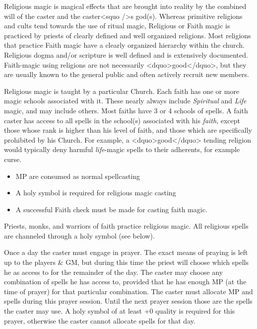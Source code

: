 Religious magic is magical effects that are brought into reality by
the combined will of the caster and the caster<squo />s god(s).  Whereas
primitive religions and cults tend towards the use of ritual magic,
Religious or Faith magic is practiced by priests of clearly defined
and well organized religions.  Most religions that practice Faith
magic have a clearly organized hierarchy within the church.  Religious
dogma and/or scripture is well defined and is extensively documented.
Faith-magic using religions are not necessarily <dquo>good</dquo>, but they are
usually known to the general public and often actively recruit new
members.

Religious magic is taught by a particular Church. Each faith has one
or more magic schools associated with it.  These nearly always include
\emph{Spiritual} and \emph{Life} magic, and may include others.  Most
faiths have 3 or 4 schools of spells.  A faith caster has access to
all spells in the school(s) associated with his \emph{faith}, except
those whose rank is higher than his level of faith, and those which
are specifically prohibited by his Church.  For example, a <dquo>good</dquo>
tending religion would typically deny harmful \emph{life}-magic spells
to their adherents, for example curse.

\begin{itemize}
\item	MP are consumed as normal spellcasting
\item	A holy symbol is required for religious magic casting
\item	A successful Faith check must be made for casting faith magic.
\end{itemize}

Priests, monks, and warriors of faith practice religious magic.  All
religious spells are channeled through a holy symbol (see below).

Once a day the caster must engage in prayer.  The exact means of
praying is left up to the players \& GM, but during this time the
priest will choose which spells he as access to for the remainder of
the day.  The caster may choose any combination of spells he has
access to, provided that he has enough MP (at the time of prayer) for
that particular combination.  The caster must allocate MP and spells
during this prayer session.  Until the next prayer session those are
the spells the caster may use.  A holy symbol of at least +0 quality
is required for this prayer, otherwise the caster cannot allocate
spells for that day.

